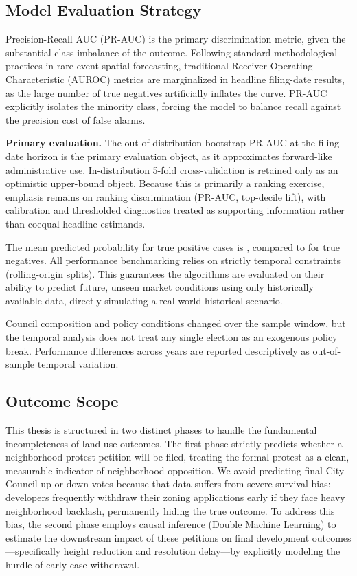 \documentclass[twoside,11pt]{article}
\begin{document}
  \subsection{Model Evaluation Strategy}

Precision-Recall AUC (PR-AUC) is the primary discrimination metric, given the substantial class imbalance of the outcome. Following standard methodological practices in rare-event spatial forecasting, traditional Receiver Operating Characteristic (AUROC) metrics are marginalized in headline filing-date results, as the large number of true negatives artificially inflates the curve. PR-AUC explicitly isolates the minority class, forcing the model to balance recall against the precision cost of false alarms.

\textbf{Primary evaluation.} The out-of-distribution bootstrap PR-AUC at the filing-date horizon is the primary evaluation object, as it approximates forward-like administrative use. In-distribution 5-fold cross-validation is retained only as an optimistic upper-bound object. Because this is primarily a ranking exercise, emphasis remains on ranking discrimination (PR-AUC, top-decile lift), with calibration and thresholded diagnostics treated as supporting information rather than coequal headline estimands.


The mean predicted probability for true positive cases is \metricMeanProbTP{}, compared to \metricMeanProbTN{} for true negatives. All performance benchmarking relies on strictly temporal constraints (rolling-origin splits). This guarantees the algorithms are evaluated on their ability to predict future, unseen market conditions using only historically available data, directly simulating a real-world historical scenario.

Council composition and policy conditions changed over the sample window, but the temporal analysis does not treat any single election as an exogenous policy break. Performance differences across years are reported descriptively as out-of-sample temporal variation.


\subsection{Outcome Scope}
\label{sec:supporting_stages}

This thesis is structured in two distinct phases to handle the fundamental incompleteness of land use outcomes. The first phase strictly predicts whether a neighborhood protest petition will be filed, treating the formal protest as a clean, measurable indicator of neighborhood opposition. We avoid predicting final City Council up-or-down votes because that data suffers from severe survival bias: developers frequently withdraw their zoning applications early if they face heavy neighborhood backlash, permanently hiding the true outcome. To address this bias, the second phase employs causal inference (Double Machine Learning) to estimate the downstream impact of these petitions on final development outcomes---specifically height reduction and resolution delay---by explicitly modeling the hurdle of early case withdrawal.
\end{document}
